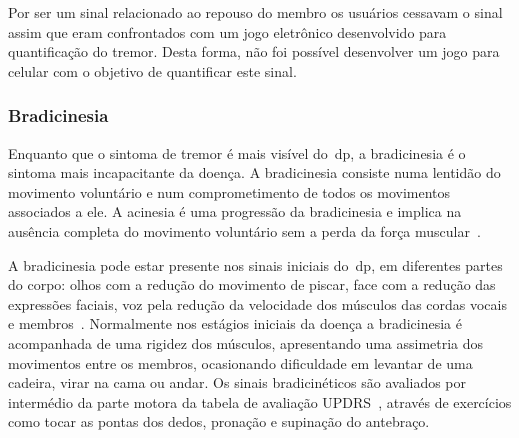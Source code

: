 Por ser um sinal relacionado ao repouso do membro os usuários cessavam o sinal assim que eram confrontados com um jogo eletrônico desenvolvido para quantificação do tremor. Desta forma, não foi possível desenvolver um jogo para celular com o objetivo de quantificar este sinal.


\subsubsection{Bradicinesia}\label{section:analise_bradicinesia}
Enquanto que o sintoma de tremor é mais visível do~\ac{dp}, a bradicinesia é o sintoma mais incapacitante da doença. A bradicinesia consiste numa lentidão do movimento voluntário e num comprometimento de todos os movimentos associados a ele. A acinesia é uma progressão da bradicinesia e implica na ausência completa do movimento voluntário sem a perda da força muscular~\cite{do2007parkinson}.

A bradicinesia pode estar presente nos sinais iniciais do~\ac{dp}, em diferentes partes do corpo: olhos com a redução do movimento de piscar, face com a redução das expressões faciais, voz pela redução da velocidade dos músculos das cordas vocais e membros~\cite{do2007parkinson}. Normalmente nos estágios iniciais da doença a bradicinesia é acompanhada de uma rigidez dos músculos, apresentando uma assimetria dos movimentos entre os membros, ocasionando dificuldade em levantar de uma cadeira, virar na cama ou andar. Os sinais bradicinéticos são avaliados por intermédio da parte motora da tabela de avaliação UPDRS~\cite{updrs87}, através de exercícios como tocar as pontas dos dedos, pronação e supinação do antebraço. 

